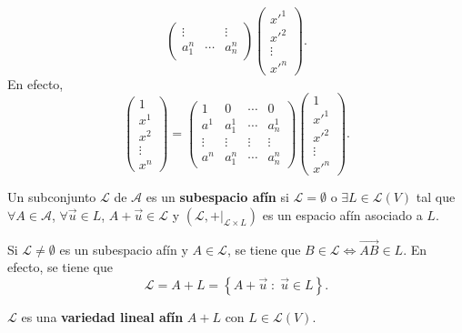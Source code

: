 \begin{observation}
\[\begin{pmatrix}
\vdots & & \vdots \\
a^{n}_{1} & \cdots & a^{n}_{n}\end{pmatrix}\begin{pmatrix} x'^{1} \\ x'^{2} \\ \vdots \\ x'^{n} \end{pmatrix} .\]
En efecto,
\[ \begin{pmatrix} 1 \\ x^{1} \\ x^{2} \\ \vdots \\ x^{n} \end{pmatrix} =  \begin{pmatrix} 1 & 0 & \cdots & 0 \\a^{1} & a^{1}_{1}  & \cdots & a^{1}_{n} \\
\vdots & \vdots & \vdots & \vdots \\
a^{n} & a^{n}_{1} & \cdots & a^{n}_{n}\end{pmatrix}\begin{pmatrix} 1 \\ x'^{1} \\ x'^{2} \\ \vdots \\ x'^{n} \end{pmatrix}.\]
\end{observation}
\begin{fdefinition}
\normalfont Un subconjunto $\displaystyle \mathcal{L}  $ de $\displaystyle \mathcal{A} $ es un \textbf{subespacio afín} si $\displaystyle \mathcal{L} = \emptyset $ o $\displaystyle \exists L \in \mathcal{L}\left(V\right) $ tal que $\displaystyle \forall A \in \mathcal{A} $, $\displaystyle \forall \vec{u} \in L $, $\displaystyle A + \vec{u} \in \mathcal{L} $ y $\displaystyle \left(\mathcal{L}, +|_{\mathcal{L}\times L}\right) $ es un espacio afín asociado a $\displaystyle L $.
\end{fdefinition}
Si $\displaystyle \mathcal{L} \neq \emptyset $ es un subespacio afín y $\displaystyle A \in \mathcal{L} $, se tiene que $\displaystyle B \in \mathcal{L} \iff\overrightarrow{AB} \in L$. En efecto, se tiene que 
\[ \mathcal{L} = A + L = \left\{ A +\vec{u} \; : \; \vec{u} \in L\right\} .\]
\begin{fdefinition}[]
\normalfont $\displaystyle \mathcal{L} $ es una \textbf{variedad lineal afín} $\displaystyle A + L $ con $\displaystyle L \in \mathcal{L}\left(V\right) $.
\end{fdefinition}
